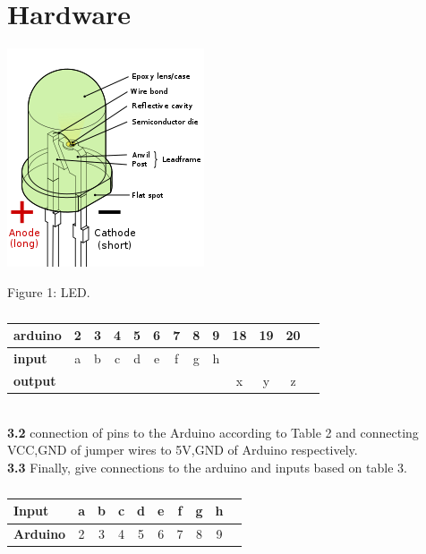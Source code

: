 \documentclass[10pt, a4paper]{article}
\begin{document}
 \section{Hardware}
    \begin{center}
\includegraphics[scale=.20]{led.png}
\end{center}
Figure 1: LED.
 \begin{table}[htbp]
    \begin{center}
    \begin{tabular}{|l|c|c|c|c|c|c|c|c|c|c|c|c} \hline \textbf{arduino}
  & 2 & 3 & 4 & 5 & 6 & 7 & 8 & 9 & 18 & 19 & 20 \\
 \hline
 \textbf{input} & a & b & c & d & e & f & g & h & & &  \\ \hline
\textbf{output} & & & & & & & &  & x & y & z \\ \hline
\end{tabular}   
\end{center}
\caption{\label{table:dummytable} }
\end{table}
\\ \textbf{3.2}
 connection of pins to the Arduino according to Table 2 and connecting VCC,GND of jumper wires to 5V,GND of Arduino respectively.
\\ \textbf{3.3}
Finally, give connections to the arduino and inputs based on table 3.
 \begin{table}[htbp]
    \begin{center}
    \begin{tabular}{|l|c|c|c|c|c|c|c|c|c|} \hline 
 
\textbf{Input} & a & b & c & d & e & f & g & h  \\ \hline
\textbf{Arduino} & 2 & 3 & 4 & 5& 6 & 7 & 8 & 9\\ \hline
\end{tabular}   
\end{center}
\caption{\label{table:dummytable} }
\end{table}
\end{document}
